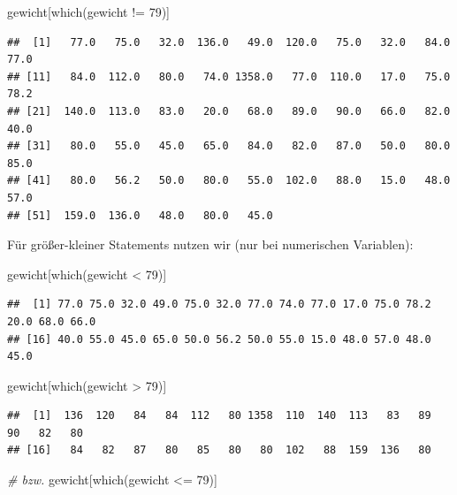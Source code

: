 \documentclass[
]{book}
\newenvironment{Shaded}{\begin{snugshade}}{\end{snugshade}}
\newcommand{\CommentTok}[1]{\textcolor[rgb]{0.56,0.35,0.01}{\textit{#1}}}
\newcommand{\DecValTok}[1]{\textcolor[rgb]{0.00,0.00,0.81}{#1}}
\newcommand{\FunctionTok}[1]{\textcolor[rgb]{0.00,0.00,0.00}{#1}}
\newcommand{\NormalTok}[1]{#1}
\newcommand{\SpecialCharTok}[1]{\textcolor[rgb]{0.00,0.00,0.00}{#1}}
\begin{document}
\begin{Shaded}
\begin{Highlighting}[]
\NormalTok{gewicht[}\FunctionTok{which}\NormalTok{(gewicht }\SpecialCharTok{!=} \DecValTok{79}\NormalTok{)]}
\end{Highlighting}
\end{Shaded}

\begin{verbatim}
##  [1]   77.0   75.0   32.0  136.0   49.0  120.0   75.0   32.0   84.0   77.0
## [11]   84.0  112.0   80.0   74.0 1358.0   77.0  110.0   17.0   75.0   78.2
## [21]  140.0  113.0   83.0   20.0   68.0   89.0   90.0   66.0   82.0   40.0
## [31]   80.0   55.0   45.0   65.0   84.0   82.0   87.0   50.0   80.0   85.0
## [41]   80.0   56.2   50.0   80.0   55.0  102.0   88.0   15.0   48.0   57.0
## [51]  159.0  136.0   48.0   80.0   45.0
\end{verbatim}

Für größer-kleiner Statements nutzen wir (nur bei numerischen Variablen):

\begin{Shaded}
\begin{Highlighting}[]
\NormalTok{gewicht[}\FunctionTok{which}\NormalTok{(gewicht }\SpecialCharTok{\textless{}} \DecValTok{79}\NormalTok{)]}
\end{Highlighting}
\end{Shaded}

\begin{verbatim}
##  [1] 77.0 75.0 32.0 49.0 75.0 32.0 77.0 74.0 77.0 17.0 75.0 78.2 20.0 68.0 66.0
## [16] 40.0 55.0 45.0 65.0 50.0 56.2 50.0 55.0 15.0 48.0 57.0 48.0 45.0
\end{verbatim}

\begin{Shaded}
\begin{Highlighting}[]
\NormalTok{gewicht[}\FunctionTok{which}\NormalTok{(gewicht }\SpecialCharTok{\textgreater{}} \DecValTok{79}\NormalTok{)]}
\end{Highlighting}
\end{Shaded}

\begin{verbatim}
##  [1]  136  120   84   84  112   80 1358  110  140  113   83   89   90   82   80
## [16]   84   82   87   80   85   80   80  102   88  159  136   80
\end{verbatim}

\begin{Shaded}
\begin{Highlighting}[]
\CommentTok{\# bzw.}
\NormalTok{gewicht[}\FunctionTok{which}\NormalTok{(gewicht }\SpecialCharTok{\textless{}=} \DecValTok{79}\NormalTok{)]}
\end{Highlighting}
\end{Shaded}
\end{document}
